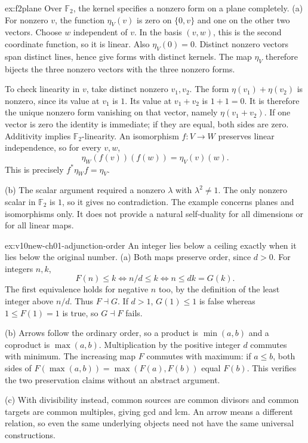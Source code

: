 \begin{solution}{ex:f2plane}
\idea Over $\mathbb F_2$, the kernel specifies a nonzero form on a plane completely.
\writeup (a) For nonzero $v$, the function $\eta_V(v)$ is zero on $\{0,v\}$ and one on the other two vectors. Choose $w$ independent of $v$. In the basis $(v,w)$, this is the second coordinate function, so it is linear. Also $\eta_V(0)=0$. Distinct nonzero vectors span distinct lines, hence give forms with distinct kernels. The map $\eta_V$ therefore bijects the three nonzero vectors with the three nonzero forms.

To check linearity in $v$, take distinct nonzero $v_1,v_2$. The form $\eta(v_1)+\eta(v_2)$ is nonzero, since its value at $v_1$ is $1$. Its value at $v_1+v_2$ is $1+1=0$. It is therefore the unique nonzero form vanishing on that vector, namely $\eta(v_1+v_2)$. If one vector is zero the identity is immediate; if they are equal, both sides are zero. Additivity implies $\mathbb F_2$-linearity. An isomorphism $f:V\to W$ preserves linear independence, so for every $v,w$,
\[
\eta_W(f(v))(f(w))=\eta_V(v)(w).
\]
This is precisely $f^*\eta_Wf=\eta_V$.

(b) The scalar argument required a nonzero $\lambda$ with $\lambda^2\ne1$. The only nonzero scalar in $\mathbb F_2$ is $1$, so it gives no contradiction. The example concerns planes and isomorphisms only. It does not provide a natural self-duality for all dimensions or for all linear maps.
\end{solution}

\begin{solution}{ex:v10new-ch01-adjunction-order}
\idea An integer lies below a ceiling exactly when it lies below the original number.
\writeup (a) Both maps preserve order, since $d>0$. For integers $n,k$,
\[
F(n)\le k\iff n/d\le k\iff n\le dk=G(k).
\]
The first equivalence holds for negative $n$ too, by the definition of the least integer above $n/d$. Thus $F\dashv G$. If $d>1$, $G(1)\le1$ is false whereas $1\le F(1)=1$ is true, so $G\dashv F$ fails.

(b) Arrows follow the ordinary order, so a product is $\min(a,b)$ and a coproduct is $\max(a,b)$. Multiplication by the positive integer $d$ commutes with minimum. The increasing map $F$ commutes with maximum: if $a\le b$, both sides of $F(\max(a,b))=\max(F(a),F(b))$ equal $F(b)$. This verifies the two preservation claims without an abstract argument.

(c) With divisibility instead, common sources are common divisors and common targets are common multiples, giving gcd and lcm. An arrow means a different relation, so even the same underlying objects need not have the same universal constructions.
\end{solution}

